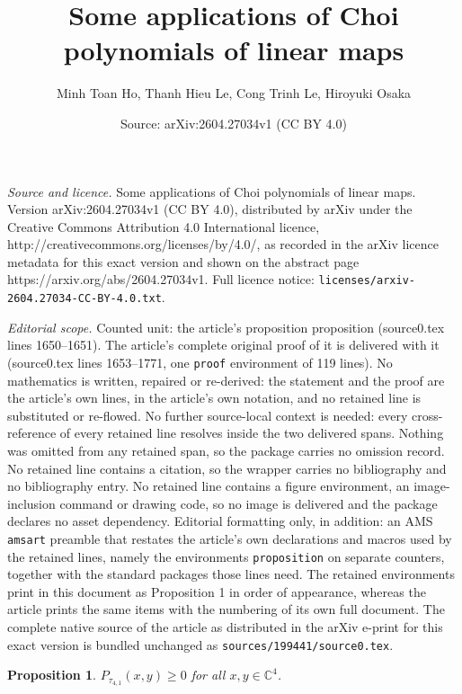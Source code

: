 \documentclass[10pt,a4paper]{amsart}
\title{Some applications of Choi polynomials of linear maps}
\author{Minh Toan Ho, Thanh Hieu Le, Cong Trinh Le, Hiroyuki Osaka}
\date{Source: arXiv:2604.27034v1 (CC BY 4.0)}
\newtheorem{proposition}{Proposition}
\begin{document}
\maketitle

\noindent\emph{Source and licence.} Some applications of Choi polynomials of linear maps. Version arXiv:2604.27034v1 (CC BY 4.0), distributed by arXiv under the Creative Commons Attribution 4.0 International licence, http://creativecommons.org/licenses/by/4.0/, as recorded in the arXiv licence metadata for this exact version and shown on the abstract page https://arxiv.org/abs/2604.27034v1. Full licence notice: \texttt{licenses/arxiv-2604.27034-CC-BY-4.0.txt}.\par\smallskip

\noindent\textit{Editorial scope.} Counted unit: the article's proposition proposition (source0.tex lines 1650--1651). The article's complete original proof of it is delivered with it (source0.tex lines 1653--1771, one \texttt{proof} environment of 119 lines). No mathematics is written, repaired or re-derived: the statement and the proof are the article's own lines, in the article's own notation, and no retained line is substituted or re-flowed.  No further source-local context is needed: every cross-reference of every retained line resolves inside the two delivered spans.  Nothing was omitted from any retained span, so the package carries no omission record.  No retained line contains a citation, so the wrapper carries no bibliography and no bibliography entry.  No retained line contains a figure environment, an image-inclusion command or drawing code, so no image is delivered and the package declares no asset dependency.  Editorial formatting only, in addition: an AMS \texttt{amsart} preamble that restates the article's own declarations and macros used by the retained lines, namely the environments \texttt{proposition} on separate counters, together with the standard packages those lines need.  The retained environments print in this document as Proposition 1 in order of appearance, whereas the article prints the same items with the numbering of its own full document.  The complete native source of the article as distributed in the arXiv e-print for this exact version is bundled unchanged as \texttt{sources/199441/source0.tex}.
\begin{proposition} $ P_{\tau_{4,1}}(x,y)\ge 0 $  for all $x,y\in\mathbb C^4$.
\end{proposition}
\end{document}
